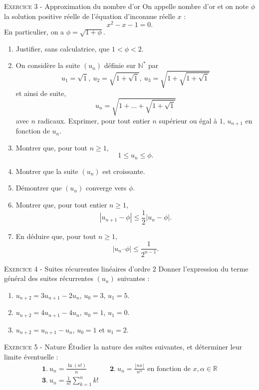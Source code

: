 \documentclass[11pt]{article}
\begin{document}
\vskip0.3cm\noindent\textsc{Exercice 3} - Approximation du nombre d'or
\vskip0.2cm
On appelle nombre d'or et on note $\phi$ la solution positive réelle de l'équation d'inconnue réelle $x$ :
$$x^2-x-1=0.$$
En particulier, on  a $\phi=\sqrt{1+\phi}$.
\begin{enumerate}
\item Justifier, sans calculatrice, que $1<\phi<2$. 
\item On considère la suite $(u_n)$ définie sur $\mathbb N^*$ par 
$$u_1=\sqrt 1,\ u_2=\sqrt{1+\sqrt{1}},\ u_3=\sqrt{1+\sqrt{1+\sqrt 1}}$$
et ainsi de suite, 
$$u_n=\sqrt{1+\dots+\sqrt{1+\sqrt 1}}$$
avec $n$ radicaux.\newline
Exprimer, pour tout entier $n$ supérieur ou égal à $1$, $u_{n+1}$ en fonction de $u_n$.
\item Montrer que, pour tout $n\geq 1$,
$$1\leq u_n\leq\phi.$$
\item Montrer que la suite $(u_n)$ est croissante.
\item Démontrer que $(u_n)$ converge vers $\phi$.
\item Montrer que, pour tout entier $n\geq 1$, 
$$|u_{n+1}-\phi|\leq \frac 12 |u_n-\phi|.$$
\item En déduire que, pour tout $n\geq 1$,
$$|u_n–\phi|\leq\frac 1{2^{n-1}}.$$
\end{enumerate}




\vskip0.3cm\noindent\textsc{Exercice 4} - Suites récurrentes linéaires d'ordre 2
\vskip0.2cm
Donner l'expression du terme général des suites récurrentes $(u_n)$ suivantes :
\begin{enumerate}
\item $u_{n+2}=3u_{n+1}-2u_n$, $u_0=3$, $u_1=5$.
\item $u_{n+2}=4u_{n+1}-4u_n$, $u_0=1$, $u_1=0$.
\item $u_{n+2}=u_{n+1}-u_n$, $u_0=1$ et $u_1=2$.
\end{enumerate}




\vskip0.3cm\noindent\textsc{Exercice 5} - Nature
\vskip0.2cm
\'Etudier la nature des suites suivantes, et déterminer leur limite éventuelle :
$$\begin{array}{lcl}
\displaystyle \mathbf 1.\ u_n=\frac{\ln(n!)}n&&\displaystyle\mathbf 2.\ u_n=\frac{\lfloor nx\rfloor}{n^\alpha}\textrm{ en fonction de }x,\alpha\in\mathbb R\\
\displaystyle \mathbf 3.\ u_n=\frac{1}{n!}\sum_{k=1}^n k!
\end{array}$$
\end{document}

